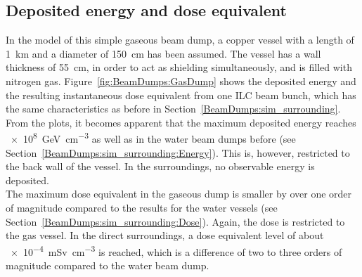 \subsection{Deposited energy and dose equivalent}
In the \fluka model of this simple gaseous beam dump, a copper vessel with a length of \SI{1}{\kilo\meter} and a diameter of \SI{150}{\centi\meter} has been assumed.
The vessel has a wall thickness of \SI{55}{\centi\meter}, in order to act as shielding simultaneously, and is filled with nitrogen gas.
Figure~\ref{fig:BeamDumps:GasDump} shows the deposited energy and the resulting instantaneous dose equivalent from one ILC beam bunch, which has the same characteristics as before in Section~\ref{BeamDumps:sim_surrounding}.
From the plots, it becomes apparent that the maximum deposited energy reaches \SI{e8}{\GeV\per\centi\meter\cubed} as well as in the water beam dumps before (see Section~\ref{BeamDumps:sim_surrounding:Energy}).
This is, however, restricted to the back wall of the vessel.
In the surroundings, no observable energy is deposited.
\\The maximum dose equivalent in the gaseous dump is smaller by over one order of magnitude compared to the results for the water vessels (see Section~\ref{BeamDumps:sim_surrounding:Dose}).
Again, the dose is restricted to the gas vessel.
In the direct surroundings, a dose equivalent level of about \SI{e-4}{\milli\sievert\per\centi\meter\cubed} is reached, which is a difference of two to three orders of magnitude compared to the water beam dump.
